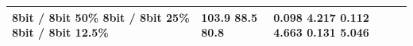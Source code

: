 \begin{tabular}{lll}
\toprule
8bit / 8bit 50\% 8bit / 8bit 25\% 8bit / 8bit 12.5\% & 103.9 88.5 80.8 & 0.098 4.217 0.112 4.663 0.131 5.046 \\
\midrule
\bottomrule
\end{tabular}

